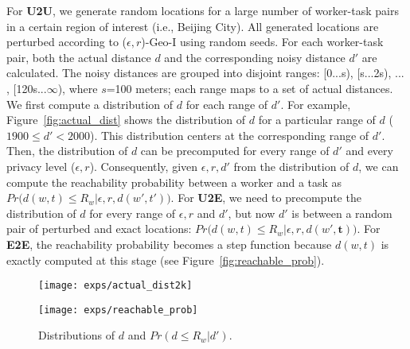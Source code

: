\documentclass{USC-Thesis}
\numberwithin{equation}{chapter}
\begin{document}
For \textbf{U2U}, we generate random locations for a large number of worker-task pairs in a certain region of interest (i.e., Beijing City). All generated locations are perturbed according to ($\epsilon,r$)-Geo-I using random seeds. For each worker-task pair, both the actual distance $d$ and the corresponding noisy distance $d'$ are calculated. The noisy distances are grouped into disjoint ranges: [0...s), [s...2s), ... , [120s...$\infty$), where $s$=100 meters; each range maps to a set of actual distances. We first compute a distribution of $d$ for each range of $d'$. For example, Figure~\ref{fig:actual_dist} shows the distribution of $d$ for a particular range of $d$ ($1900\le d'< 2000$). This distribution centers at the corresponding range of $d'$. Then, the distribution of $d$ can be precomputed for every range of $d'$ and every privacy level ($\epsilon, r$). Consequently, given $\epsilon, r, d'$ from the distribution of $d$, we can compute the reachability probability between a worker and a task as $\mathit{Pr\big(d(w,t) \le R_w | \epsilon,r,d(w',t')\big)}$.
For \textbf{U2E}, we need to precompute the distribution of $d$ for every range of $\epsilon, r$ and $d'$, but now $d'$ is between a random pair of perturbed and exact locations: $\mathit{Pr\big(d(w,t) \le R_w | \epsilon,r,d(w',\mathbf{t})\big)}$.
For \textbf{E2E}, the reachability probability becomes a step function because $d(w,t)$ is exactly computed at this stage (see Figure~\ref{fig:reachable_prob}).

\begin{figure}[ht]
	\begin{minipage}[b]{.45\linewidth}
		\centering
		\texttt{[image: exps/actual\_dist2k]}
		\captionsetup{format=hang}
		\label{fig:actual_dist}
	\end{minipage}
	\vspace{10pt}
	\begin{minipage}[b]{.45\linewidth}
		\centering
		\texttt{[image: exps/reachable\_prob]}
        \captionsetup{format=hang}
		\label{fig:reachable_prob}
	\end{minipage}
	\caption{Distributions of $d$ and $Pr(d\le R_w|d')$.}
	\label{fig:empirical}
\end{figure}
\end{document}
